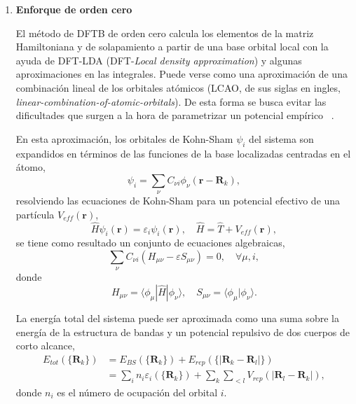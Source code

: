 \begin{enumerate}
    \item \textbf{Enforque de orden cero}

        El método de DFTB de orden cero calcula los elementos de la matriz 
        Hamiltoniana y de solapamiento a partir de una base orbital local con la
        ayuda de DFT-LDA (DFT-\textit{Local density approximation}) y algunas
        aproximaciones en las integrales. Puede verse como una aproximación de 
        una combinación lineal de los orbitales atómicos (LCAO, de sus siglas en 
        ingles, \textit{linear-combination-of-atomic-orbitals}). De esta forma se
        busca evitar las dificultades que surgen a la hora de parametrizar un 
        potencial empírico ~\cite{dftb1, dftb2}.

        En esta aproximación, los orbitales de Kohn-Sham $\psi_i$ del sistema
        son expandidos en términos de las funciones de la base localizadas 
        centradas en el átomo,
        $$
        \psi_i = \sum_{\nu} C_{\nu i} \phi_{\nu}(\mathbf{r}-\mathbf{R}_k),
        $$
        resolviendo las ecuaciones de Kohn-Sham para un potencial efectivo de una
        partícula $V_{eff}(\mathbf{r})$,
        \begin{equation}\label{eq:kohn-sham-mod}
            \hat{H} \psi_i(\mathbf{r}) = \varepsilon_i \psi_i(\mathbf{r}), \quad \hat{H} = \hat{T} + V_{eff}(\mathbf{r}),
        \end{equation}
        se tiene como resultado un conjunto de ecuaciones algebraicas,
        $$
        \sum_{\nu} C_{\nu i} (H_{\mu \nu} - \varepsilon S_{\mu \nu}) = 0, \quad \forall \mu, i,
        $$
        donde
        $$
        H_{\mu \nu} = \langle \phi_{\mu}|\hat{H}|\phi_{\nu} \rangle, \quad S_{\mu \nu} = \langle\phi_{\mu}|\phi_{\nu}\rangle.
        $$

        La energía total del sistema puede ser aproximada como una suma sobre la
        energía de la estructura de bandas y un potencial repulsivo de dos cuerpos
        de corto alcance,
        \begin{equation*}
            \begin{aligned}
                   E_{tot}(\{\mathbf{R}_k\}) &= E_{BS}(\{\mathbf{R}_k\}) + E_{rep}(\{|\mathbf{R}_k - \mathbf{R}_l|\}) \\
                    &= \sum_i n_i \varepsilon_i(\{\mathbf{R}_k\}) + \sum_k \sum_{<l} V_{rep}(|\mathbf{R}_l - \mathbf{R}_k|),
            \end{aligned}
        \end{equation*}
        donde $n_i$ es el número de ocupación del orbital $i$.
        

\end{enumerate}
